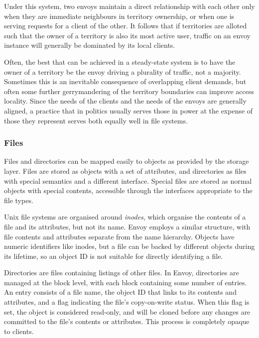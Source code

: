Under this system, two envoys maintain a direct relationship with each other only when they are immediate neighbours in territory ownership, or when one is serving requests for a client of the other. It follows that if territories are alloted such that the owner of a territory is also its most active user, traffic on an envoy instance will generally be dominated by its local clients.

Often, the best that can be achieved in a steady-state system is to have the owner of a territory be the envoy driving a plurality of traffic, not a majority. Sometimes this is an inevitable consequence of overlapping client demands, but often some further gerrymandering of the territory boundaries can improve access locality. Since the needs of the clients and the needs of the envoys are generally aligned, a practice that in politics usually serves those in power at the expense of those they represent serves both equally well in file systems.

\subsubsection{Files}\label{sec:directory-format}

Files and directories can be mapped easily to objects as provided by the storage layer. Files are stored as objects with a set of attributes, and directories as files with special semantics and a different interface. Special files are stored as normal objects with special contents, accessible through the interfaces appropriate to the file types.

Unix file systems are organised around \emph{inodes}, which organise the contents of a file and its attributes, but not its name. Envoy employs a similar structure, with file contents and attributes separate from the name hierarchy. Objects have numeric identifiers like inodes, but a file can be backed by different objects during its lifetime, so an object ID is not suitable for directly identifying a file.

Directories are files containing listings of other files. In Envoy, directories are managed at the block level, with each block containing some number of entries. An entry consists of a file name, the object ID that links to its contents and attributes, and a flag indicating the file's copy-on-write status. When this flag is set, the object is considered read-only, and will be cloned before any changes are committed to the file's contents or attributes. This process is completely opaque to clients.

